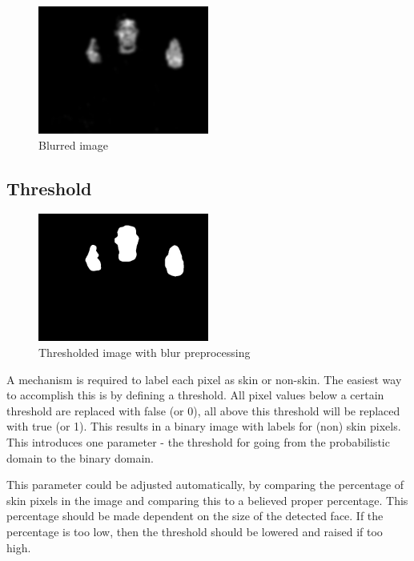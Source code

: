 \begin{figure}[htbp]
    \center{}
    \includegraphics[width=0.5\textwidth]{figures/pipeline/blurred.jpg}
	\caption{Blurred image}
	\label{fig:blurred}
\end{figure}


\subsection*{Threshold}

\begin{figure}[htbp]
    \center{}
    \includegraphics[width=0.5\textwidth]{figures/pipeline/thresholded.jpg}
	\caption{Thresholded image with blur preprocessing}
	\label{fig:threshold}
\end{figure}

A mechanism is required to label each pixel as skin or non-skin. The easiest way to accomplish this is by defining a threshold. All pixel values below a certain threshold are replaced with false (or 0), all above this threshold will be replaced with true (or 1). This results in a binary image with labels for (non) skin pixels. This introduces one parameter - the threshold for going from the probabilistic domain to the binary domain.

This parameter could be adjusted automatically, by comparing the percentage of skin pixels in the image and comparing this to a believed proper percentage. This percentage should be made dependent on the size of the detected face. If the percentage is too low, then the threshold should be lowered and raised if too high. 


